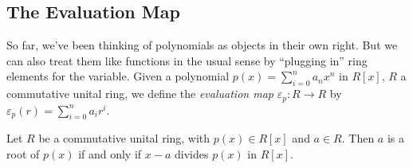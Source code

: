 \documentclass{article}
\begin{document}
\subsection*{The Evaluation Map}

So far, we've been thinking of polynomials as objects in their own right. But we can also treat them like functions in the usual sense by ``plugging in'' ring elements for the variable. Given a polynomial $p(x) = \sum_{i=0}^n a_nx^n$ in $R[x]$, $R$ a commutative unital ring, we define the \emph{evaluation map} $\varepsilon_p : R \rightarrow R$ by $\varepsilon_p(r) = \sum_{i=0}^n a_i r^i$.

\begin{prop}
Let $R$ be a commutative unital ring, with $p(x) \in R[x]$ and $a \in R$. Then $a$ is a root of $p(x)$ if and only if $x-a$ divides $p(x)$ in $R[x]$.
\end{prop}
\end{document}
